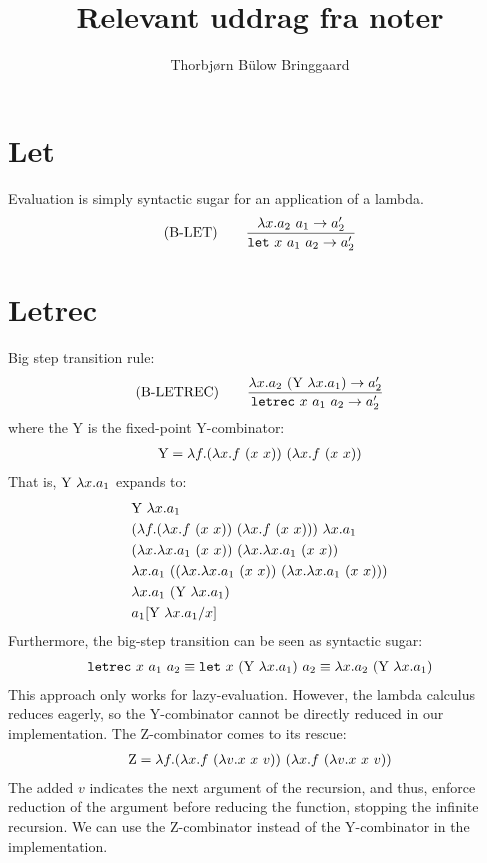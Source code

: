 \documentclass[10pt,a4paper,english]{article}
\newcommand\letin[3]{\texttt{let}~#1~#2~#3}
\newcommand\letrec[3]{\texttt{letrec}~#1~#2~#3}
\begin{document}
\title{Relevant uddrag fra noter}
\author{Thorbjørn Bülow Bringgaard}
\maketitle
{}

\section{Let}
Evaluation is simply syntactic sugar for an application of a lambda.
\begin{align}
(\text{B-LET})\qquad
\frac{\app{\abs{x}{a_2}}{a_1}\to a_2'}{\letin{x}{a_1}{a_2} \to a_2'}
\end{align}

\section{Letrec}
Big step transition rule:
\begin{align}
(\text{B-LETREC})\qquad
\frac{\app{\abs{x}{a_2}}{(\app{\text{Y}}{\abs{x}{a_1}})}\to a_2'}{\letrec{x}{a_1}{a_2} \to a_2'}
\end{align}
where the Y is the fixed-point Y-combinator:
\begin{align}
  \text{Y} = \lambda f.(\lambda x.f~(x~x))~(\lambda x.f~(x~x))
\end{align}
That is, $\text{Y}~\lambda x.a_1$ expands to:
\begin{align}
&\text{Y}~\lambda x.a_1\\
&(\lambda f.(\lambda x.f~(x~x))~(\lambda x.f~(x~x)))~\lambda x.a_1\\
&(\lambda x.\lambda x.a_1~(x~x))~(\lambda x.\lambda x.a_1~(x~x))\\
&\lambda x.a_1~((\lambda x.\lambda x.a_1~(x~x))~(\lambda x.\lambda x.a_1~(x~x)))\\
&\lambda x.a_1~(\text{Y}~\lambda x.a_1)\\
&a_1[\text{Y}~\lambda x.a_1/x]
\end{align}
Furthermore, the big-step transition can be seen as syntactic sugar:
\begin{align}
  \letrec{x}{a_1}{a_2} \equiv
  \letin{x}{(\app{\text{Y}}{\abs{x}{a_1}})}{a_2}\equiv
  \app{\abs{x}{a_2}}{(\app{\text{Y}}{\abs{x}{a_1}})}
\end{align}
This approach only works for lazy-evaluation. However, the lambda calculus
reduces eagerly, so the Y-combinator cannot be directly reduced in our
implementation. The Z-combinator comes to its rescue:
\begin{align}
  \text{Z} = \lambda f.(\lambda x.f~(\lambda v.x~x~v))~(\lambda x.f~(\lambda v.x~x~v))
\end{align}
The added $v$ indicates the next argument of the recursion, and thus, enforce
reduction of the argument before reducing the function, stopping the infinite
recursion. We can use the Z-combinator instead of the Y-combinator in the
implementation.
\end{document}
